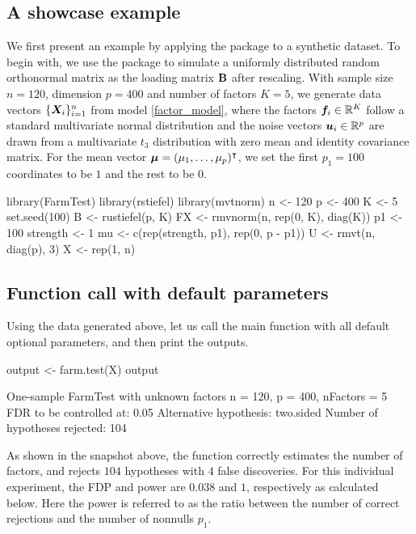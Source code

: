 



\subsection{A showcase example}\label{sec:data_generate}

We first present an example by applying the package to a synthetic dataset.
To begin with, we use the  package \citep{H2012} to simulate a uniformly distributed random orthonormal matrix as the loading matrix $\mathbf{B}$ after rescaling. With sample size $n = 120$, dimension $p = 400$ and number of factors $K = 5$, we generate data vectors $\{\bm{X}_i\}_{i = 1}^{n}$ from model \eqref{factor_model}, where the factors $\bm f_i \in \mathbb{R}^K$ follow a standard multivariate normal distribution and the noise vectors $ \bm{u}_i \in \mathbb{R}^p $ are drawn from a multivariate $t_3$ distribution with zero mean and identity covariance matrix. For the mean vector $\bm{\mu} = (\mu_1, \ldots, \mu_p)^\intercal$, we set the first $p_1=100$ coordinates to be  $1$ and the rest to be $0$.
\begin{example*}
library(FarmTest)
library(rstiefel)
library(mvtnorm)
n <- 120
p <- 400
K <- 5
set.seed(100)
B <- rustiefel(p, K) %
FX <- rmvnorm(n, rep(0, K), diag(K))
p1 <- 100
strength <- 1
mu <- c(rep(strength, p1), rep(0, p - p1))
U <- rmvt(n, diag(p), 3)
X <- rep(1, n) %
\end{example*}



\subsection{Function call with default parameters} \label{demo1}
Using the data generated above, let us call the main function  with all default optional parameters, and then print the outputs.
\begin{example*}
output <- farm.test(X)
output

One-sample FarmTest with unknown factors
n = 120, p = 400, nFactors = 5
FDR to be controlled at: 0.05
Alternative hypothesis: two.sided
Number of hypotheses rejected: 104
\end{example*}

As shown in the snapshot above, the function  correctly estimates the number of factors, and rejects $104$ hypotheses with $4$ false discoveries. For this individual experiment, the FDP and power are $0.038$ and $1$, respectively as calculated below. Here the power is referred to as the ratio between the number of correct rejections and the number of nonnulls $p_1$.

